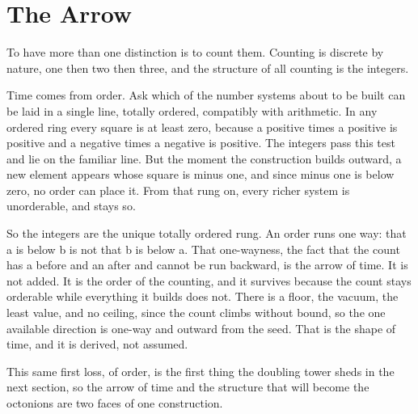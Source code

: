 \section{The Arrow}

To have more than one distinction is to count them. Counting is discrete by nature, one then two then three, and the structure of all counting is the integers.

Time comes from order. Ask which of the number systems about to be built can be laid in a single line, totally ordered, compatibly with arithmetic. In any ordered ring every square is at least zero, because a positive times a positive is positive and a negative times a negative is positive. The integers pass this test and lie on the familiar line. But the moment the construction builds outward, a new element appears whose square is minus one, and since minus one is below zero, no order can place it. From that rung on, every richer system is unorderable, and stays so.

So the integers are the unique totally ordered rung. An order runs one way: that a is below b is not that b is below a. That one-wayness, the fact that the count has a before and an after and cannot be run backward, is the arrow of time. It is not added. It is the order of the counting, and it survives because the count stays orderable while everything it builds does not. There is a floor, the vacuum, the least value, and no ceiling, since the count climbs without bound, so the one available direction is one-way and outward from the seed. That is the shape of time, and it is derived, not assumed.

This same first loss, of order, is the first thing the doubling tower sheds in the next section, so the arrow of time and the structure that will become the octonions are two faces of one construction.
